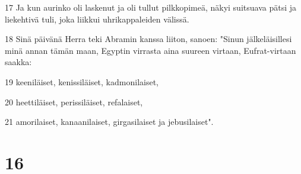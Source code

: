 \par 17 Ja kun aurinko oli laskenut ja oli tullut pilkkopimeä, näkyi suitsuava pätsi ja liekehtivä tuli, joka liikkui uhrikappaleiden välissä.
\par 18 Sinä päivänä Herra teki Abramin kanssa liiton, sanoen: "Sinun jälkeläisillesi minä annan tämän maan, Egyptin virrasta aina suureen virtaan, Eufrat-virtaan saakka:
\par 19 keeniläiset, kenissiläiset, kadmonilaiset,
\par 20 heettiläiset, perissiläiset, refalaiset,
\par 21 amorilaiset, kanaanilaiset, girgasilaiset ja jebusilaiset".

\chapter{16}

